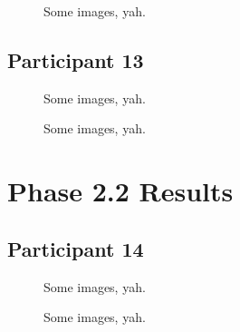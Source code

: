 \begin{figure}[h]
	\caption{Some images, yah.}
\end{figure}


\clearpage

\subsection{Participant 13}

\begin{figure}[h]
	\caption{Some images, yah.}
\end{figure}

\clearpage

\begin{figure}[h]
	\caption{Some images, yah.}
\end{figure}


\clearpage

\section{Phase 2.2 Results}


\clearpage

\subsection{Participant 14}

\begin{figure}[h]
	\caption{Some images, yah.}
\end{figure}

\clearpage

\begin{figure}[h]
	\caption{Some images, yah.}
\end{figure}

